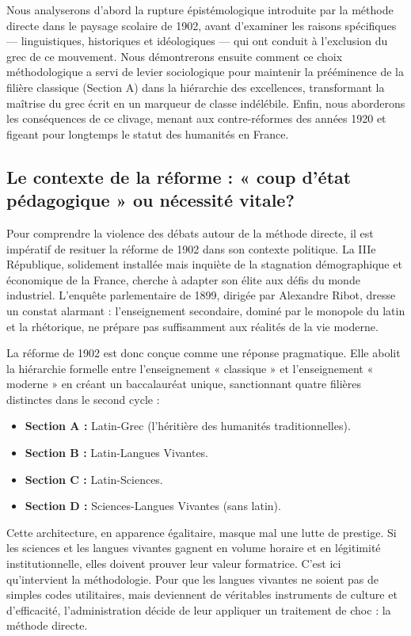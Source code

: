 Nous analyserons d'abord la rupture épistémologique introduite par la méthode directe dans le
paysage scolaire de 1902, avant d'examiner les raisons spécifiques — linguistiques, historiques et
idéologiques — qui ont conduit à l'exclusion du grec de ce mouvement. Nous démontrerons ensuite
comment ce choix méthodologique a servi de levier sociologique pour maintenir la prééminence de la
filière classique (Section A) dans la hiérarchie des excellences, transformant la maîtrise du grec
écrit en un marqueur de classe indélébile. Enfin, nous aborderons les conséquences de ce clivage,
menant aux contre-réformes des années 1920 et figeant pour longtemps le statut des humanités en
France.



\subsection{Le contexte de la réforme : « coup d'état pédagogique » ou nécessité vitale?}

Pour comprendre la violence des débats autour de la méthode directe, il est impératif de resituer la
réforme de 1902 dans son contexte politique. La IIIe République, solidement installée mais inquiète
de la stagnation démographique et économique de la France, cherche à adapter son élite aux défis du
monde industriel. L'enquête parlementaire de 1899, dirigée par Alexandre Ribot, dresse un constat
alarmant : l'enseignement secondaire, dominé par le monopole du latin et la rhétorique, ne prépare
pas suffisamment aux réalités de la vie moderne.\cite{I-2-2-ref1}

La réforme de 1902 est donc conçue comme une réponse pragmatique. Elle abolit la hiérarchie formelle
entre l'enseignement « classique » et l'enseignement « moderne » en créant un baccalauréat unique,
sanctionnant quatre filières distinctes dans le second cycle :

\begin{itemize}\item \textbf{Section A :} Latin-Grec (l'héritière des humanités traditionnelles).\item \textbf{Section B :} Latin-Langues Vivantes.\item \textbf{Section C :} Latin-Sciences.\item \textbf{Section D :} Sciences-Langues Vivantes (sans latin).\end{itemize}Cette architecture, en apparence égalitaire, masque mal une lutte de prestige. Si les sciences et
les langues vivantes gagnent en volume horaire et en légitimité institutionnelle, elles doivent
prouver leur valeur formatrice. C'est ici qu'intervient la méthodologie. Pour que les langues
vivantes ne soient pas de simples codes utilitaires, mais deviennent de véritables instruments de
culture et d'efficacité, l'administration décide de leur appliquer un traitement de choc : la
méthode directe.



